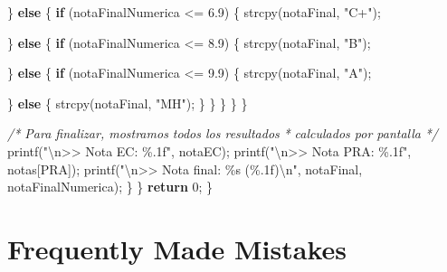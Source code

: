 \documentclass[
]{book}
\newenvironment{Shaded}{\begin{snugshade}}{\end{snugshade}}
\newcommand{\CommentTok}[1]{\textcolor[rgb]{0.56,0.35,0.01}{\textit{#1}}}
\newcommand{\ControlFlowTok}[1]{\textcolor[rgb]{0.13,0.29,0.53}{\textbf{#1}}}
\newcommand{\DecValTok}[1]{\textcolor[rgb]{0.00,0.00,0.81}{#1}}
\newcommand{\FloatTok}[1]{\textcolor[rgb]{0.00,0.00,0.81}{#1}}
\newcommand{\NormalTok}[1]{#1}
\newcommand{\SpecialCharTok}[1]{\textcolor[rgb]{0.00,0.00,0.00}{#1}}
\newcommand{\StringTok}[1]{\textcolor[rgb]{0.31,0.60,0.02}{#1}}
\begin{document}
\begin{Shaded}
\begin{Highlighting}[]
\NormalTok{                \} }\ControlFlowTok{else}\NormalTok{ \{}
                    \ControlFlowTok{if}\NormalTok{ (notaFinalNumerica \textless{}= }\FloatTok{6.9}\NormalTok{) \{}
\NormalTok{                        strcpy(notaFinal, }\StringTok{"C+"}\NormalTok{);}

\NormalTok{                    \} }\ControlFlowTok{else}\NormalTok{ \{}
                        \ControlFlowTok{if}\NormalTok{ (notaFinalNumerica \textless{}= }\FloatTok{8.9}\NormalTok{) \{}
\NormalTok{                            strcpy(notaFinal, }\StringTok{"B"}\NormalTok{);}

\NormalTok{                        \} }\ControlFlowTok{else}\NormalTok{ \{}
                            \ControlFlowTok{if}\NormalTok{ (notaFinalNumerica \textless{}= }\FloatTok{9.9}\NormalTok{) \{}
\NormalTok{                                strcpy(notaFinal, }\StringTok{"A"}\NormalTok{);}

\NormalTok{                            \} }\ControlFlowTok{else}\NormalTok{ \{}
\NormalTok{                                strcpy(notaFinal, }\StringTok{"MH"}\NormalTok{);}
\NormalTok{                            \}}
\NormalTok{                        \}}
\NormalTok{                    \}}
\NormalTok{                \}}
\NormalTok{            \}}

            \CommentTok{/* Para finalizar, mostramos todos los resultados}
\CommentTok{             * calculados por pantalla}
\CommentTok{             */}
\NormalTok{            printf(}\StringTok{"}\SpecialCharTok{\textbackslash{}n}\StringTok{\textgreater{}\textgreater{} Nota EC: \%.1f"}\NormalTok{, notaEC);}
\NormalTok{            printf(}\StringTok{"}\SpecialCharTok{\textbackslash{}n}\StringTok{\textgreater{}\textgreater{} Nota PRA: \%.1f"}\NormalTok{, notas[PRA]);}
\NormalTok{            printf(}\StringTok{"}\SpecialCharTok{\textbackslash{}n}\StringTok{\textgreater{}\textgreater{} Nota final: \%s (\%.1f)}\SpecialCharTok{\textbackslash{}n}\StringTok{"}\NormalTok{, notaFinal, notaFinalNumerica);}
\NormalTok{        \}}
\NormalTok{    \}}
    \ControlFlowTok{return} \DecValTok{0}\NormalTok{;}
\NormalTok{\}}
\end{Highlighting}
\end{Shaded}

\hypertarget{frequently-made-mistakes-2}{%
\section{Frequently Made Mistakes}\label{frequently-made-mistakes-2}}
\end{document}
